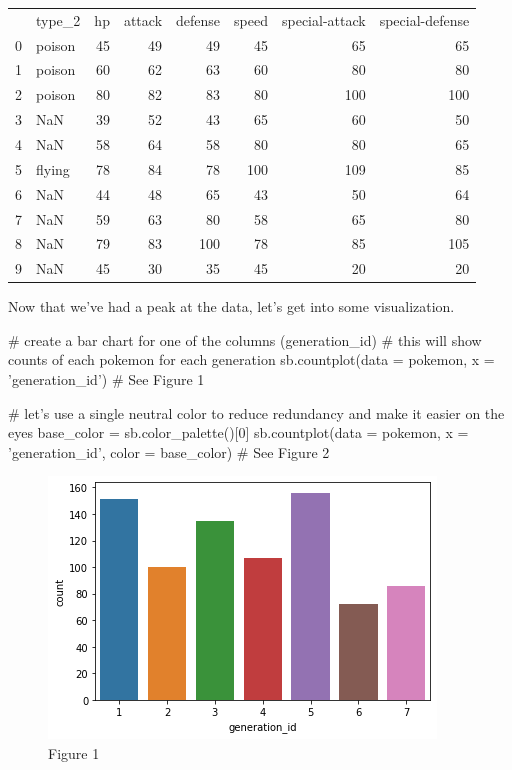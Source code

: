 \begin{center}
	\begin{tabular}{llrrrrrr}
		{} &  type\_2 &  hp &  attack &  defense &  speed &  special-attack &  special-defense \\
		0 &  poison &  45 &      49 &       49 &     45 &              65 &               65 \\
		1 &  poison &  60 &      62 &       63 &     60 &              80 &               80 \\
		2 &  poison &  80 &      82 &       83 &     80 &             100 &              100 \\
		3 &     NaN &  39 &      52 &       43 &     65 &              60 &               50 \\
		4 &     NaN &  58 &      64 &       58 &     80 &              80 &               65 \\
		5 &  flying &  78 &      84 &       78 &    100 &             109 &               85 \\
		6 &     NaN &  44 &      48 &       65 &     43 &              50 &               64 \\
		7 &     NaN &  59 &      63 &       80 &     58 &              65 &               80 \\
		8 &     NaN &  79 &      83 &      100 &     78 &              85 &              105 \\
		9 &     NaN &  45 &      30 &       35 &     45 &              20 &               20 \\
	\end{tabular}
\end{center}

Now that we've had a peak at the data, let's get into some visualization.

\begin{python}
	# create a bar chart for one of the columns (generation_id)
	# this will show counts of each pokemon for each generation
	sb.countplot(data = pokemon, x = 'generation_id')
	# See Figure 1
	
	# let's use a single neutral color to reduce redundancy and make it easier on the eyes
	base_color = sb.color_palette()[0]
	sb.countplot(data = pokemon, x = 'generation_id', color = base_color)
	# See Figure 2
\end{python}

\newpage
\begin{figure}
	\includegraphics{images/figure1.png}
	\caption{Figure 1}\label{fig:figure1}
\end{figure}

